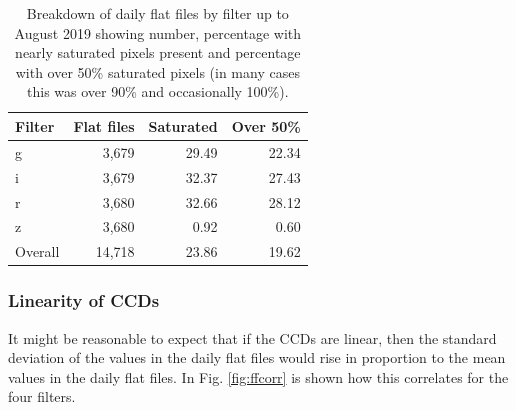 \begin{table}[!htbp]
\begin{center}
\begin{tabular}{lrrr} \hline
Filter & Flat files & Saturated & Over 50\%\\\hline
g & 3,679 & 29.49 & 22.34 \\
i & 3,679 & 32.37 & 27.43 \\
r & 3,680 & 32.66 & 28.12 \\
z & 3,680 & 0.92 & 0.60 \\\hline
Overall & 14,718 & 23.86 & 19.62\\
\hline
\end{tabular}
\end{center}
\caption{Breakdown of daily flat files by filter up to August 2019 showing
number, percentage with nearly saturated pixels present and percentage with over
50\% saturated pixels (in many cases this was over 90\% and occasionally 100\%).}
\protect\label{table:satpix}
\end{table}

\subsubsection{Linearity of CCDs}

It might be reasonable to expect that if the CCDs are linear, then the standard
deviation of the values in the daily flat files would rise in proportion to the
mean values in the daily flat files. In Fig. \ref{fig:ffcorr} is shown how this
correlates for the four filters.

